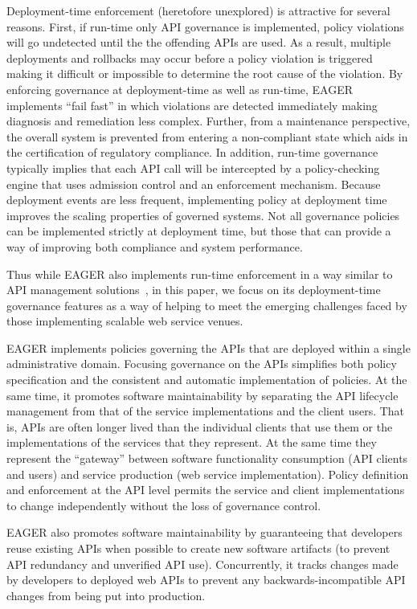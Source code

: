 Deployment-time enforcement (heretofore unexplored) is attractive for several
reasons.  First, if run-time only API governance is implemented, 
policy violations will go undetected until the the offending APIs are used.  
As a result, multiple deployments and rollbacks may occur before a policy
violation is triggered making it difficult or impossible to determine the root
cause of the violation.  By enforcing governance at deployment-time as well as
run-time, EAGER implements ``fail fast'' in which violations are detected
immediately making diagnosis and remediation less complex.  
Further, from a maintenance perspective,  the overall
system is prevented from entering a non-compliant state which aids in the
certification of regulatory compliance.  In addition, run-time governance
typically implies that each API call will be intercepted by a policy-checking engine
that uses admission control and an enforcement mechanism.  Because deployment
events are less frequent, implementing policy at deployment time improves the
scaling properties of governed systems.   Not all governance policies can be
implemented strictly at deployment time, but those that can provide a way
of improving both compliance and system performance.

Thus while
EAGER also implements run-time
enforcement in a way similar to API management
solutions~\cite{wso2am,apigee,layer7,3scale}, in this paper, we focus
on its deployment-time governance features as a way of helping to meet the
emerging challenges faced by those
implementing scalable web service venues. 

EAGER implements policies governing the APIs that are 
deployed within a single administrative domain.  Focusing governance on
the APIs simplifies both policy specification and the consistent
and automatic implementation of policies.  At the same time, it promotes
software maintainability by separating the API lifecycle management from that
of the service implementations and the client users.  That is, APIs are often
longer lived than the individual clients that use them or the implementations
of the services that they represent.  At the same time they represent the
``gateway'' between software functionality consumption 
(API clients and users) and service
production (web service implementation).  Policy definition and enforcement at
the API level permits the service and client implementations to change
independently without the loss of governance control.

EAGER also promotes software maintainability by guaranteeing that 
developers reuse existing APIs when possible to create new software artifacts
(to prevent API redundancy and unverified API use). Concurrently, it
tracks changes made by developers to deployed web APIs to prevent
any backwards-incompatible API changes from being put into production.

